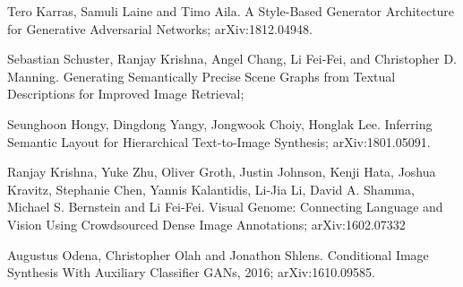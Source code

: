 \documentclass{article}
\begin{document}
\begin{thebibliography}{1}
Tero Karras, Samuli Laine and Timo Aila.
\newblock A Style-Based Generator Architecture for Generative Adversarial Networks;
\newblock arXiv:1812.04948.

Sebastian Schuster, Ranjay Krishna, Angel Chang,
Li Fei-Fei, and Christopher D. Manning.
\newblock Generating Semantically Precise Scene Graphs from Textual Descriptions for Improved Image Retrieval;

Seunghoon Hongy, Dingdong Yangy, Jongwook Choiy, Honglak Lee.
\newblock Inferring Semantic Layout for Hierarchical Text-to-Image Synthesis;
\newblock arXiv:1801.05091.


Ranjay Krishna, Yuke Zhu, Oliver Groth, Justin Johnson, Kenji Hata, Joshua Kravitz, Stephanie Chen, Yannis Kalantidis, Li-Jia Li, David A. Shamma, Michael S. Bernstein and Li Fei-Fei.
\newblock Visual Genome: Connecting Language and Vision Using Crowdsourced Dense Image Annotations;
\newblock arXiv:1602.07332

Augustus Odena, Christopher Olah and Jonathon Shlens.
\newblock Conditional Image Synthesis With Auxiliary Classifier GANs, 2016;
\newblock arXiv:1610.09585.


\end{thebibliography}

% 
\end{document}
